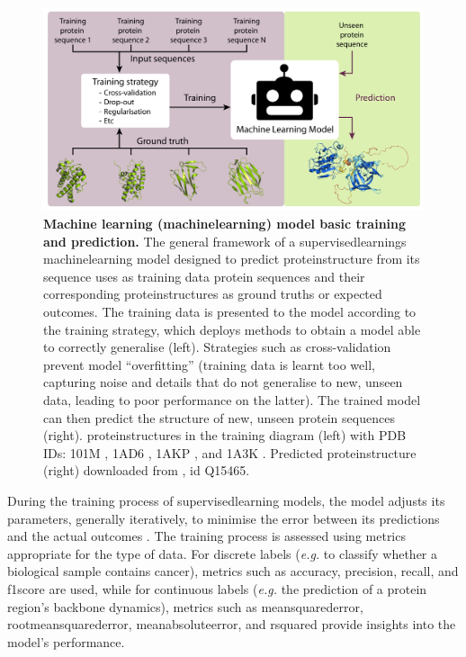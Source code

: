 \begin{figure}[tbh!]
    \centering
    \includegraphics[width=0.95\linewidth]{figures/ml_basics.pdf}
    \caption{\textbf{Machine learning (\gls{machinelearning}) model basic training and prediction.} The general framework of a \glspl{supervisedlearning} \gls{machinelearning} model designed to predict \gls{proteinstructure} from its sequence uses as training data protein sequences and their corresponding \glspl{proteinstructure} as ground truths or expected outcomes. The training data is presented to the model according to the training strategy, which deploys methods to obtain a model able to correctly generalise (left). Strategies such as cross-validation prevent model ``overfitting'' (training data is learnt too well, capturing noise and details that do not generalise to new, unseen data, leading to poor performance on the latter). The trained model can then predict the structure of new, unseen protein sequences (right). \Glspl{proteinstructure} in the training diagram (left) with PDB IDs: 101M \cite{smith_robert_david_correlations_1999}, 1AD6 \cite{kim_structural_1997}, 1AKP \cite{constantine_sequential_1994}, and 1A3K \cite{seetharaman_x-ray_1998}. Predicted \gls{proteinstructure} (right) downloaded from , id Q15465.}
    \label{fig:chapter1:ml_basics}
\end{figure}


During the training process of \gls{supervisedlearning} models, the model adjusts its parameters, generally iteratively, to minimise the error between its predictions and the actual outcomes \cite{loog_chapter_2018}. The training process is assessed using metrics appropriate for the type of data. For discrete labels (\textit{e.g.} to classify whether a biological sample contains cancer), metrics such as \gls{accuracy}, \gls{precision}, \gls{recall}, and \Gls{f1score} \cite{naidu_review_2023} are used, while for continuous labels (\textit{e.g.} the prediction of a protein region's \gls{backbone} dynamics), metrics such as \Gls{meansquarederror}, \gls{rootmeansquarederror}, \gls{meanabsoluteerror}, and \gls{rsquared} \cite{botchkarev_performance_2019, chicco_coefficient_2021} provide insights into the model's performance.


